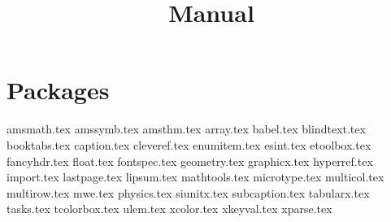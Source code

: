 \documentclass{iarticle}
\title{Manual}
\begin{document}
\tableofcontents

\section{Packages}

{amsmath.tex}
{amssymb.tex}
{amsthm.tex}
{array.tex}
{babel.tex}
{blindtext.tex}
{booktabs.tex}
{caption.tex}
{cleveref.tex}
{enumitem.tex}
{esint.tex}
{etoolbox.tex}
{fancyhdr.tex}
{float.tex}
{fontspec.tex}
{geometry.tex}
{graphicx.tex}
{hyperref.tex}
{import.tex}
{lastpage.tex}
{lipsum.tex}
{mathtools.tex}
{microtype.tex}
{multicol.tex}
{multirow.tex}
{mwe.tex}
{physics.tex}
{siunitx.tex}
{subcaption.tex}
{tabularx.tex}
{tasks.tex}
{tcolorbox.tex}
{ulem.tex}
{xcolor.tex}
{xkeyval.tex}
{xparse.tex}
\end{document}
